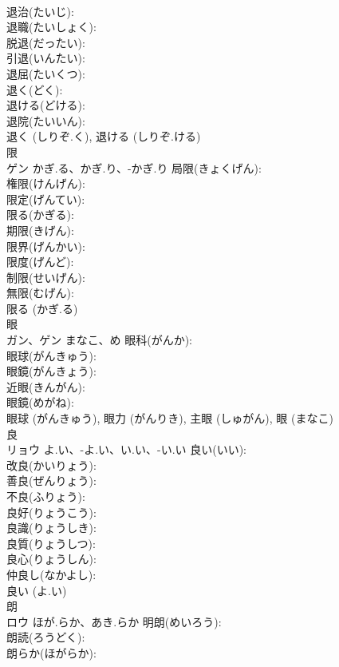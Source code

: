 \documentclass[8pt]{extreport}
\begin{document}
\begin{CJK}{UTF8}{min}
\\	退治(たいじ): 
\\	退職(たいしょく): 
\\	脱退(だったい): 
\\	引退(いんたい): 
\\	退屈(たいくつ): 
\\	退く(どく): 
\\	退ける(どける): 
\\	退院(たいいん): 
\\	退く (しりぞ.く), 退ける (しりぞ.ける)
\\	限			
\\	ゲン	かぎ.る、かぎ.り、-かぎ.り	局限(きょくげん): 
\\	権限(けんげん): 
\\	限定(げんてい): 
\\	限る(かぎる): 
\\	期限(きげん): 
\\	限界(げんかい): 
\\	限度(げんど): 
\\	制限(せいげん): 
\\	無限(むげん): 
\\	限る (かぎ.る)
\\	眼			
\\	ガン、ゲン	まなこ、め	眼科(がんか): 
\\	眼球(がんきゅう): 
\\	眼鏡(がんきょう): 
\\	近眼(きんがん): 
\\	眼鏡(めがね): 
\\	眼球 (がんきゅう), 眼力 (がんりき), 主眼 (しゅがん), 眼 (まなこ)
\\	良			
\\	リョウ	よ.い、-よ.い、い.い、-い.い	良い(いい): 
\\	改良(かいりょう): 
\\	善良(ぜんりょう): 
\\	不良(ふりょう): 
\\	良好(りょうこう): 
\\	良識(りょうしき): 
\\	良質(りょうしつ): 
\\	良心(りょうしん): 
\\	仲良し(なかよし): 
\\	良い (よ.い)
\\	朗			
\\	ロウ	ほが.らか、あき.らか	明朗(めいろう): 
\\	朗読(ろうどく): 
\\	朗らか(ほがらか): 

\end{CJK}
\end{document}
